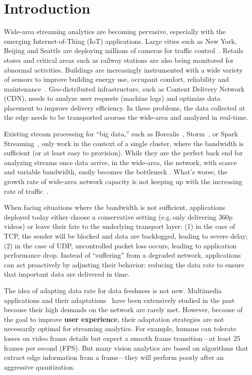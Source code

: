 \chapter{Introduction}

Wide-area streaming analytics are becoming pervasive, especially with the
emerging Internet-of-Thing (IoT) applications. Large cities such as New York,
Beijing and Seattle are deploying millions of cameras for traffic
control~\cite{london.surveillance,skynet}. Retails stores and critical areas
such as railway stations are also being monitored for abnormal
activities. Buildings are increasingly instrumented with a wide variety of
sensors to improve building energy use, occupant comfort, reliability and
maintenance~\cite{krioukov2012building}. Geo-distributed infrastructure, such as
Content Delivery Network (CDN), needs to analyze user requests (machine logs)
and optimize data placement to improve delivery efficiency. In these problems,
the data collected at the edge needs to be transported acoross the wide-area and
analyzed in real-time.

Existing stream processing for ``big data,'' such as
Borealis~\cite{abadi2005design}, Storm~\cite{toshniwal2014storm}, or Spark
Streaming~\cite{zaharia2012discretized}, only work in the context of a single
cluster, where the bandwidth is sufficient (or at least easy to
provision). While they are the perfect back end for analyzing streams once data
arrive, in the wide-area, the network, with scarce and variable bandwidth,
easily becomes the bottleneck \cite{rabkin2014aggregation}. What's worse, the
growth rate of wide-area network capacity is not keeping up with the increasing
rate of traffic~\cite{index2013zettabyte}.

When facing situations where the bandwidth is not sufficient, applications
deployed today either choose a conservative setting (e.g.\,only delivering 360p
videos) or leave their fate to the underlying transport layer: (1) in the case
of TCP, the sender will be blocked and data are backlogged, leading to severe
delay; (2) in the case of UDP, uncontrolled packet loss occurs, leading to
application performance drop. Instead of ``suffering'' from a degraded network,
applications can act proactively by adjusting their behavior: reducing the data
rate to ensure that important data are delivered in time.

The idea of adapting data rate for data freshness is not new. Multimedia
applications and their adaptations~\cite{michalos2012dynamic,
  schulzrinne1998real} have been extensively studied in the past because their
high demands on the network are rarely met. However, because of the goal to
improve \textbf{user experience}, their adaptation strategies are not
necessarily optimal for streaming analytics. For example, humans can tolerate
losses on video frame details but expect a smooth frame transition---at least 25
frames per second (FPS). But many vision analytics are based on algorithms that
extract edge information from a frame---they will perform poorly after an
aggressive quantization.

